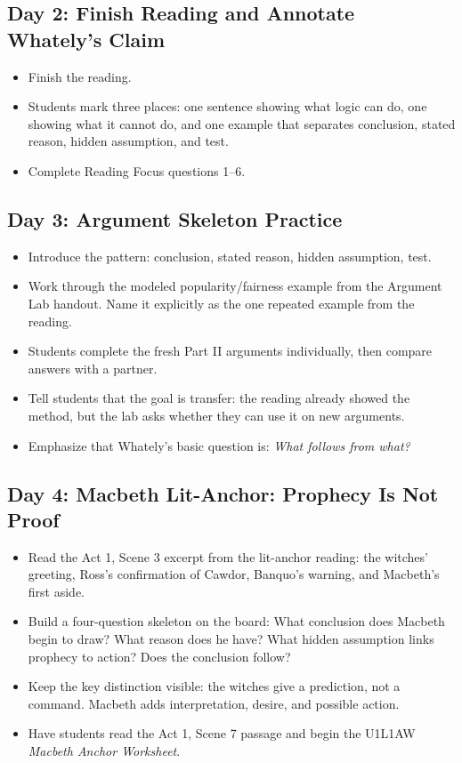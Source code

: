 \documentclass[12pt]{article}
\begin{document}
\subsection*{Day 2: Finish Reading and Annotate Whately's Claim}
\begin{itemize}[leftmargin=*]
\item Finish the reading.
\item Students mark three places: one sentence showing what logic can do, one showing what it cannot do, and one example that separates conclusion, stated reason, hidden assumption, and test.
\item Complete Reading Focus questions 1--6.
\end{itemize}

\subsection*{Day 3: Argument Skeleton Practice}
\begin{itemize}[leftmargin=*]
\item Introduce the pattern: conclusion, stated reason, hidden assumption, test.
\item Work through the modeled popularity/fairness example from the Argument Lab handout. Name it explicitly as the one repeated example from the reading.
\item Students complete the fresh Part II arguments individually, then compare answers with a partner.
\item Tell students that the goal is transfer: the reading already showed the method, but the lab asks whether they can use it on new arguments.
\item Emphasize that Whately's basic question is: \textit{What follows from what?}
\end{itemize}

\subsection*{Day 4: Macbeth Lit-Anchor: Prophecy Is Not Proof}
\begin{itemize}[leftmargin=*]
\item Read the Act 1, Scene 3 excerpt from the lit-anchor reading: the witches' greeting, Ross's confirmation of Cawdor, Banquo's warning, and Macbeth's first aside.
\item Build a four-question skeleton on the board: What conclusion does Macbeth begin to draw? What reason does he have? What hidden assumption links prophecy to action? Does the conclusion follow?
\item Keep the key distinction visible: the witches give a prediction, not a command. Macbeth adds interpretation, desire, and possible action.
\item Have students read the Act 1, Scene 7 passage and begin the U1L1AW \textit{Macbeth Anchor Worksheet}.
\end{itemize}
\end{document}

